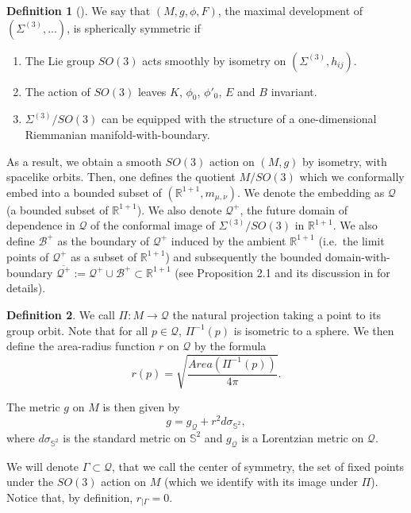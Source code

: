 \documentclass[10pt,a4paper]{article}
\theoremstyle{plain}
\theoremstyle{remark}
\theoremstyle{definition}
\newtheorem{defn}{Definition}[section]
\newcommand{\RR}{\mathbb{R}}
\theoremstyle{plain}
\theoremstyle{remark}
\theoremstyle{definition}
\numberwithin{equation}{section}
\begin{document}
\begin{defn}[\cite{Kommemi}]
	We say that $(M,g,\phi,F)$, the maximal development of $(\Sigma^{(3)},...)$, is spherically symmetric if \begin{enumerate}\item The Lie group $SO(3)$ acts smoothly by isometry on $(\Sigma^{(3)},h_{i j})$.
		\item The action of $SO(3)$ leaves $K$, $\phi_0$, $\phi'_0$, $E$ and $B$ invariant.
		\item $ \Sigma^{(3)}/ SO(3)$ can be equipped with the structure of a one-dimensional Riemmanian manifold-with-boundary.
		
	\end{enumerate}
\end{defn}

As a result, we obtain a smooth $SO(3)$ action on $(M,g)$ by isometry, with spacelike orbits. Then, one defines the quotient $ M / SO(3) $ which we conformally embed into a bounded subset of $(\RR^{1+1}, m_{\mu, \nu})$. We denote the  embedding as $\mathcal{Q}$ (a bounded subset of $\RR^{1+1}$). We also denote $\mathcal{Q}^+$, the future domain of dependence in $\mathcal{Q}$ of the conformal image of $\Sigma^{(3)}/ SO(3)$ in $\RR^{1+1}$. We also define $\mathcal{B}^+$ as the boundary of $\mathcal{Q}^+$ induced by the ambient $\RR^{1+1}$ (i.e.\ the limit points of $\mathcal{Q}^+$ as a subset of $\RR^{1+1}$)  and subsequently the bounded domain-with-boundary $\overline{\mathcal{Q}^+}:=  \mathcal{Q}^+\cup \mathcal{B}^+ \subset \RR^{1+1}$  (see Proposition 2.1 and its discussion in \cite{Kommemi} for details).


\color{black}
\begin{defn}
	We call $\Pi: M \rightarrow \mathcal{Q}$ the natural projection taking a point to its group orbit. Note that for all $p \in \mathcal{Q}$,  $\Pi^{-1}(p)$ is isometric to a sphere. We then define the area-radius function $r$ on $ \mathcal{Q}$ by the formula $$r(p)= \sqrt{\frac{Area(\Pi^{-1}(p))}{4 \pi}}.$$
\end{defn}

The metric $g$ on $M$ is then given by  \begin{equation} \label{gQ}
g= g_{\mathcal{Q}}+ r^{2}d \sigma_{\mathbb{S}^{2}},
\end{equation} where $d \sigma_{\mathbb{S}^{2}}$ is the standard metric on $\mathbb{S}^{2}$ and $g_{\mathcal{Q}}$ is a Lorentzian metric on $\mathcal{Q}$.

We will denote $\Gamma \subset \mathcal{Q}$, that we call the center of symmetry, the set of fixed points under the $SO(3)$ action on $M$ (which we identify with its image under $\Pi$). Notice that, by definition, $r_{|\Gamma}=0$.
\end{document}
